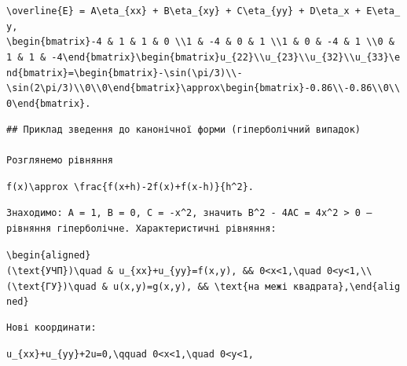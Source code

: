 \documentclass[
  ukrainian,
]{article}
\begin{document}
\texttt{\textbackslash{}overline\{E\}\ =\ A\textbackslash{}eta\_\{xx\}\ +\ B\textbackslash{}eta\_\{xy\}\ +\ C\textbackslash{}eta\_\{yy\}\ +\ D\textbackslash{}eta\_x\ +\ E\textbackslash{}eta\_y,}
\texttt{\textbackslash{}begin\{bmatrix\}-4\ \&\ 1\ \&\ 1\ \&\ 0\ \textbackslash{}\textbackslash{}1\ \&\ -4\ \&\ 0\ \&\ 1\ \textbackslash{}\textbackslash{}1\ \&\ 0\ \&\ -4\ \&\ 1\ \textbackslash{}\textbackslash{}0\ \&\ 1\ \&\ 1\ \&\ -4\textbackslash{}end\{bmatrix\}\textbackslash{}begin\{bmatrix\}u\_\{22\}\textbackslash{}\textbackslash{}u\_\{23\}\textbackslash{}\textbackslash{}u\_\{32\}\textbackslash{}\textbackslash{}u\_\{33\}\textbackslash{}end\{bmatrix\}=\textbackslash{}begin\{bmatrix\}-\textbackslash{}sin(\textbackslash{}pi/3)\textbackslash{}\textbackslash{}-\textbackslash{}sin(2\textbackslash{}pi/3)\textbackslash{}\textbackslash{}0\textbackslash{}\textbackslash{}0\textbackslash{}end\{bmatrix\}\textbackslash{}approx\textbackslash{}begin\{bmatrix\}-0.86\textbackslash{}\textbackslash{}-0.86\textbackslash{}\textbackslash{}0\textbackslash{}\textbackslash{}0\textbackslash{}end\{bmatrix\}.}

\begin{verbatim}
## Приклад зведення до канонічної форми (гіперболічний випадок)

Розглянемо рівняння
\end{verbatim}

\texttt{f\textquotesingle{}\textquotesingle{}(x)\textbackslash{}approx\ \textbackslash{}frac\{f(x+h)-2f(x)+f(x-h)\}\{h\^{}2\}.}

\begin{verbatim}
Знаходимо: A = 1, B = 0, C = -x^2, значить B^2 - 4AC = 4x^2 > 0 — рівняння гіперболічне. Характеристичні рівняння:
\end{verbatim}

\texttt{\textbackslash{}begin\{aligned\}(\textbackslash{}text\{УЧП\})\textbackslash{}quad\ \&\ u\_\{xx\}+u\_\{yy\}=f(x,y),\ \&\&\ 0\textless{}x\textless{}1,\textbackslash{}quad\ 0\textless{}y\textless{}1,\textbackslash{}\textbackslash{}(\textbackslash{}text\{ГУ\})\textbackslash{}quad\ \&\ u(x,y)=g(x,y),\ \&\&\ \textbackslash{}text\{на\ межі\ квадрата\},\textbackslash{}end\{aligned\}}

\begin{verbatim}
Нові координати:
\end{verbatim}

\texttt{u\_\{xx\}+u\_\{yy\}+2u=0,\textbackslash{}qquad\ 0\textless{}x\textless{}1,\textbackslash{}quad\ 0\textless{}y\textless{}1,}
\end{document}
